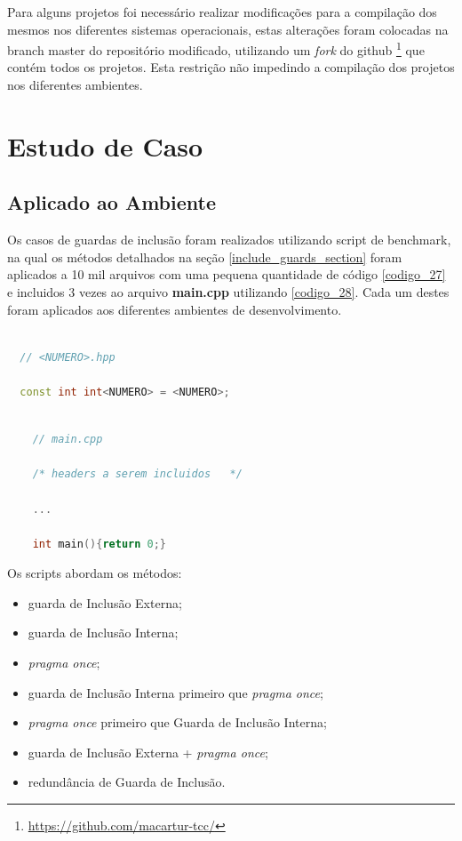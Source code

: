     Para alguns projetos foi necessário realizar modificações para a compilação
 dos mesmos nos diferentes sistemas operacionais,
estas alterações foram colocadas na branch master do repositório modificado,
utilizando um \textit{fork} do github
\footnote{\url{https://github.com/macartur-tcc/}} que contém todos os projetos.
 Esta restrição não impedindo a compilação dos projetos nos diferentes ambientes.

\section {Estudo de Caso}

\subsection{Aplicado ao Ambiente}

Os casos de guardas de inclusão foram realizados utilizando script de benchmark,
 na qual os métodos detalhados na seção \ref{include_guards_section} foram
 aplicados a 10 mil arquivos com uma pequena quantidade de código
 \ref{codigo_27} e incluidos 3 vezes ao arquivo \textbf{main.cpp} utilizando
 \ref{codigo_28}. Cada um destes foram aplicados aos diferentes ambientes de
 desenvolvimento.

\begin{lstlisting}[language=C++,caption={Template de arquivo .hpp utilizado no benchmark},
                                                   label=codigo_27]

  // <NUMERO>.hpp

  const int int<NUMERO> = <NUMERO>;

\end{lstlisting}

\begin{lstlisting}[language=C++,caption={Template de arquivo main.cpp utilizado no benchmark},
                                                          label=codigo_28]

    // main.cpp

    /* headers a serem incluidos   */

    ...

    int main(){return 0;}
\end{lstlisting}

Os scripts abordam os métodos:

\begin{itemize}
	\item guarda de Inclusão Externa;
	\item guarda de Inclusão Interna;
	\item \textit{pragma once};
	\item guarda de Inclusão Interna primeiro que \textit{pragma once};
	\item \textit{pragma once} primeiro que  Guarda de Inclusão Interna;
	\item guarda de Inclusão Externa + \textit{pragma once};
	\item redundância de Guarda de Inclusão.
\end{itemize}

